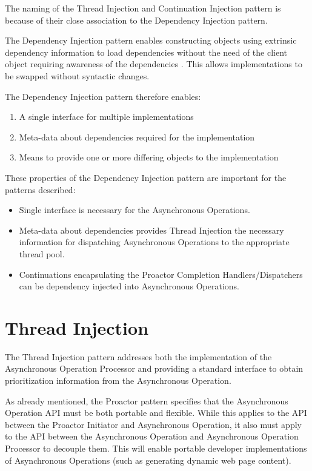 \documentclass[prodmode]{style/acmlarge}
\begin{document}
The naming of the Thread Injection and Continuation Injection pattern is because
of their close association to the Dependency Injection pattern.

The Dependency Injection pattern enables constructing objects using extrinsic
dependency information to load dependencies without the need of the client
object requiring awareness of the dependencies \cite{ioc}.  This allows
implementations to be swapped without syntactic changes.

The Dependency Injection pattern therefore enables:
\begin{enumerate}
  \item A single interface for multiple implementations
  \item Meta-data about dependencies required for the implementation
  \item Means to provide one or more differing objects to the implementation
\end{enumerate}

These properties of the Dependency Injection pattern are important for the
patterns described:
\begin{itemize}
  \item Single interface is necessary for the Asynchronous Operations.
  \item Meta-data about dependencies provides Thread Injection the necessary information for dispatching Asynchronous Operations to the appropriate thread pool.
  \item Continuations encapsulating the Proactor Completion Handlers/Dispatchers can be dependency injected into Asynchronous Operations.
\end{itemize}


\section{Thread Injection}

The Thread Injection pattern addresses both the implementation of the
Asynchronous Operation Processor and providing a standard interface to obtain
prioritization information from the Asynchronous Operation.

As already mentioned, the Proactor pattern specifies that the Asynchronous
Operation API must be both portable and flexible.  While this applies to the API
between the Proactor Initiator and Asynchronous Operation, it also must apply to
the API between the Asynchronous Operation and Asynchronous Operation Processor
to decouple them.  This will enable portable developer implementations of
Asynchronous Operations (such as generating dynamic web page content). 
\end{document}
